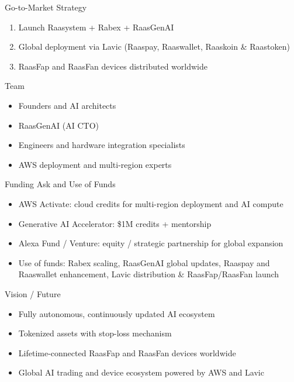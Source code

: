 \documentclass{beamer}
\begin{document}
\begin{frame}{Go-to-Market Strategy}
\begin{enumerate}
    \item Launch Raasystem + Rabex + RaasGenAI
    \item Global deployment via Lavic (Raaspay, Raaswallet, Raaskoin \& Raastoken)
    \item RaasFap and RaasFan devices distributed worldwide
\end{enumerate}
\end{frame}

\begin{frame}{Team}
\begin{itemize}
    \item Founders and AI architects
    \item RaasGenAI (AI CTO)
    \item Engineers and hardware integration specialists
    \item AWS deployment and multi-region experts
\end{itemize}
\end{frame}

\begin{frame}{Funding Ask and Use of Funds}
\begin{itemize}
    \item AWS Activate: cloud credits for multi-region deployment and AI compute
    \item Generative AI Accelerator: \$1M credits + mentorship
    \item Alexa Fund / Venture: equity / strategic partnership for global expansion
    \item Use of funds: Rabex scaling, RaasGenAI global updates, Raaspay and Raaswallet enhancement, Lavic distribution \& RaasFap/RaasFan launch
\end{itemize}
\end{frame}

\begin{frame}{Vision / Future}
\begin{itemize}
    \item Fully autonomous, continuously updated AI ecosystem
    \item Tokenized assets with stop-loss mechanism
    \item Lifetime-connected RaasFap and RaasFan devices worldwide
    \item Global AI trading and device ecosystem powered by AWS and Lavic
\end{itemize}
\end{frame}
\end{document}
